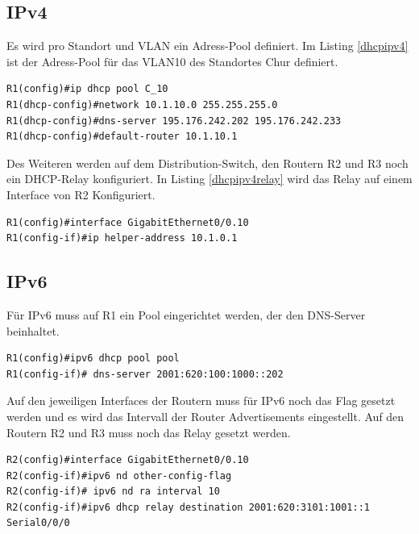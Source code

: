 \documentclass[11pt,a4paper]{scrreprt}
\begin{document}
\subsection{IPv4}
Es wird pro Standort und \acs{VLAN} ein Adress-Pool definiert. Im Listing \ref{dhcpipv4} ist der Adress-Pool für das \acs{VLAN}10 des Standortes Chur definiert.
\newline
\begin{lstlisting}[frame=single, breaklines=true, captionpos=b,caption= IPv4 \acs{DHCP}, label=dhcpipv4]
R1(config)#ip dhcp pool C_10
R1(dhcp-config)#network 10.1.10.0 255.255.255.0
R1(dhcp-config)#dns-server 195.176.242.202 195.176.242.233
R1(dhcp-config)#default-router 10.1.10.1
\end{lstlisting}
\noindent
Des Weiteren werden auf dem Distribution-Switch, den Routern R2 und R3 noch ein DHCP-Relay konfiguriert. In Listing \ref{dhcpipv4relay} wird das Relay auf einem Interface von R2 Konfiguriert.
\newline
\begin{lstlisting}[frame=single, breaklines=true, captionpos=b,caption= IPv4 \acs{DHCP}-relay, label=dhcpipv4relay]
R1(config)#interface GigabitEthernet0/0.10
R1(config-if)#ip helper-address 10.1.0.1
\end{lstlisting}



\subsection{IPv6}
Für IPv6 muss auf R1 ein Pool eingerichtet werden, der den \acs{DNS}-Server 
beinhaltet.
\newline
\begin{lstlisting}[frame=single, breaklines=true, captionpos=b,caption= IPv6 \acs{DHCP}, label=dhcpipv6]
R1(config)#ipv6 dhcp pool pool
R1(config-if)# dns-server 2001:620:100:1000::202
\end{lstlisting}

\noindent
Auf den jeweiligen Interfaces der Routern muss für IPv6 noch das Flag gesetzt werden und es wird das Intervall der Router Advertisements eingestellt. Auf den Routern R2 und R3 muss noch das Relay gesetzt werden.
\newline
\begin{lstlisting}[frame=single, breaklines=true, captionpos=b,caption= IPv6 \acs{DHCP}-relay, label=dhcpipv6relay]
R2(config)#interface GigabitEthernet0/0.10
R2(config-if)#ipv6 nd other-config-flag
R2(config-if)# ipv6 nd ra interval 10
R2(config-if)#ipv6 dhcp relay destination 2001:620:3101:1001::1 Serial0/0/0
\end{lstlisting}
 
\end{document}
